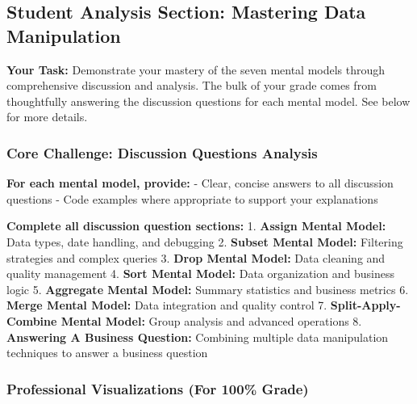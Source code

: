 \documentclass[
  letterpaper,
  DIV=11,
  numbers=noendperiod]{scrartcl}
\begin{document}
\subsection{Student Analysis Section: Mastering Data
Manipulation}\label{student-analysis-section}

\textbf{Your Task:} Demonstrate your mastery of the seven mental models
through comprehensive discussion and analysis. The bulk of your grade
comes from thoughtfully answering the discussion questions for each
mental model. See below for more details.

\subsubsection{Core Challenge: Discussion Questions
Analysis}\label{core-challenge-discussion-questions-analysis}

\textbf{For each mental model, provide:} - Clear, concise answers to all
discussion questions - Code examples where appropriate to support your
explanations

\begin{tcolorbox}[enhanced jigsaw, bottomtitle=1mm, opacitybacktitle=0.6, toptitle=1mm, colbacktitle=quarto-callout-important-color!10!white, breakable, coltitle=black, bottomrule=.15mm, left=2mm, colframe=quarto-callout-important-color-frame, colback=white, title=\textcolor{quarto-callout-important-color}{\faExclamation}\hspace{0.5em}{📊 Discussion Questions Requirements}, leftrule=.75mm, arc=.35mm, rightrule=.15mm, opacityback=0, toprule=.15mm, titlerule=0mm]

\textbf{Complete all discussion question sections:} 1. \textbf{Assign
Mental Model:} Data types, date handling, and debugging 2.
\textbf{Subset Mental Model:} Filtering strategies and complex queries
3. \textbf{Drop Mental Model:} Data cleaning and quality management 4.
\textbf{Sort Mental Model:} Data organization and business logic 5.
\textbf{Aggregate Mental Model:} Summary statistics and business metrics
6. \textbf{Merge Mental Model:} Data integration and quality control 7.
\textbf{Split-Apply-Combine Mental Model:} Group analysis and advanced
operations 8. \textbf{Answering A Business Question:} Combining multiple
data manipulation techniques to answer a business question

\end{tcolorbox}

\subsubsection{Professional Visualizations (For 100\%
Grade)}\label{professional-visualizations-for-100-grade}
\end{document}
